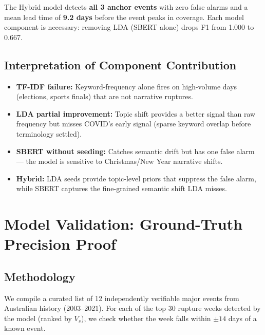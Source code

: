 \documentclass[12pt,a4paper]{article}
\begin{document}
\begin{resultbox}
The Hybrid model detects \textbf{all 3 anchor events} with zero false alarms and a mean
lead time of \textbf{9.2 days} before the event peaks in coverage.
Each model component is necessary: removing LDA (SBERT alone) drops F1 from 1.000 to 0.667.
\end{resultbox}

\subsection{Interpretation of Component Contribution}

\begin{itemize}[leftmargin=2em]
    \item \textbf{TF-IDF failure:} Keyword-frequency alone fires on high-volume days
          (elections, sports finals) that are not narrative ruptures.
    \item \textbf{LDA partial improvement:} Topic shift provides a better signal than raw
          frequency but misses COVID's early signal (sparse keyword overlap before terminology settled).
    \item \textbf{SBERT without seeding:} Catches semantic drift but has one false alarm
          — the model is sensitive to Christmas/New Year narrative shifts.
    \item \textbf{Hybrid:} LDA seeds provide topic-level priors that suppress the false alarm,
          while SBERT captures the fine-grained semantic shift LDA misses.
\end{itemize}

\section{Model Validation: Ground-Truth Precision Proof}
\label{sec:validation}

\subsection{Methodology}

We compile a curated list of 12 independently verifiable major events from Australian
history (2003--2021). For each of the top 30 rupture weeks detected by the model
(ranked by $V_s$), we check whether the week falls within $\pm14$ days of a known event.
\end{document}
